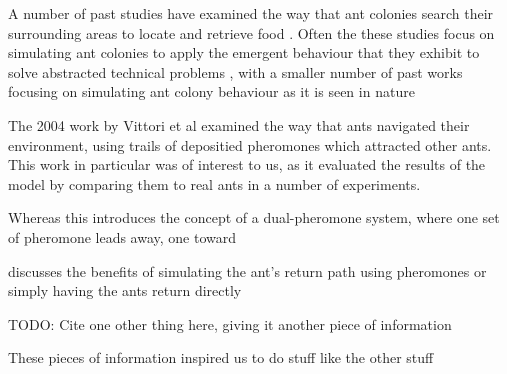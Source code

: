 		A number of past studies have examined the way that ant colonies search their surrounding areas to locate and retrieve food \cite{vittori_modeling_2004, a_panait_ant_2004}.
		Often the these studies focus on simulating ant colonies to apply the emergent behaviour that they exhibit to solve abstracted technical
		problems \cite{dorigo_ant_2006, zhang_improved_2007}, with a smaller number of past works focusing on simulating ant colony behaviour as it is seen in nature \cite{vittori_modeling_2004} %
		
		The 2004 work by Vittori et al\cite{vittori_modeling_2004} examined the way that ants navigated their environment, using trails of depositied pheromones which attracted other ants. This work in particular
    was of interest to us, as it evaluated the results of the model by comparing them to real ants in a number of experiments.
		
		Whereas this \cite{a_panait_ant_2004} introduces the concept of a dual-pheromone system, where one set of pheromone leads away, one toward
		
		\cite{a_panait_learning_2018} discusses the benefits of simulating the ant's return path using pheromones or simply having the ants return directly

		TODO: Cite one other thing here, giving it another piece of information

		These pieces of information inspired us to do stuff like the other stuff
